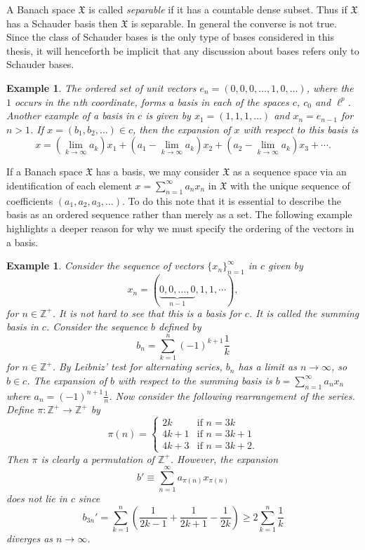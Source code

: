 \documentclass[12pt]{UNSWthesis}
\newcommand{\Z}{\mathbb{Z}}
\newcommand{\X}{\mathfrak{X}}
\def\lp{\ell^p}
\newtheorem{example}[theorem]{Example}
\numberwithin{equation}{section}
\begin{document}
A Banach space $\X$ is called {\em separable} if it has a countable dense 
subset.
Thus if $\X$ has a Schauder basis then $\X$ is separable. In general the 
converse
is not true. Since the class of Schauder bases is the only type of bases
considered in this
thesis, it will henceforth be implicit that any discussion about bases refers
only to Schauder bases.


\begin{example}
The ordered set of unit vectors $e_n=(0,0,0,\ldots,1,0,\ldots)$, where the $1$
occurs in the $n$th coordinate, forms a basis in each of the spaces
$c$, $c_0$ and $\lp$. Another example of a basis in $c$ is given by
$x_1=(1,1,1,\ldots)$
and $x_n=e_{n-1}$ for $n>1$. If $x=(b_1,b_2,\ldots)\in c$, then the expansion of
$x$ with respect to this basis is
\[x=(\lim_{k\rightarrow\infty}a_k)x_1+(a_1-\lim_{k\rightarrow\infty}a_k)x_2+
(a_2-\lim_{k\rightarrow\infty}a_k)x_3+\cdots.\] 
\end{example}


If a Banach space $\X$ has a basis, we may consider $\X$ as a sequence
space via an identification of each element $x=\sum_{n=1}^{\infty}a_nx_n$ in
$\X$ with the unique sequence of coefficients $(a_1,a_2,a_3,\ldots)$. To do this
note that it is essential to describe the basis as an ordered sequence rather
than merely as a set. The following example highlights a deeper reason for
why we must specify the ordering of the vectors in a basis.

\begin{example}\label{summing basis}
Consider the sequence of vectors $\{x_n\}_{n=1}^{\infty}$ in $c$ given by
\[x_n=(\underbrace{0,0,\ldots,0}_{n-1},1,1,\cdots),\]
for $n\in\Z^+$. It is not hard to see that this is a basis for $c$.
It is called the {\em summing basis} in $c$.
Consider the sequence $b$ defined by
\[b_n=\sum_{k=1}^n(-1)^{k+1}\frac{1}{k}\]
for $n\in\Z^+$. By Leibniz' test for alternating series,
$b_n$ has a limit as $n\rightarrow\infty$, so $b\in c$. The expansion of $b$ 
with
respect to the summing basis is $b=\sum_{n=1}^{\infty}a_nx_n$ where
$a_n=(-1)^{n+1}\frac{1}{n}$. Now consider the following rearrangement of the
series. Define $\pi:\Z^+\rightarrow\Z^+$ by
\[\pi(n)=\left\{\begin{array}{ll}
				2k & \mbox{if $n=3k$}\\
				4k+1 & \mbox{if $n=3k+1$}\\
				4k+3 & \mbox{if $n=3k+2$.}
			\end{array}\right.
\]
Then $\pi$ is clearly a permutation of $\Z^+$. However, the expansion
\[b'\equiv\sum_{n=1}^{\infty}a_{\pi(n)}x_{\pi(n)}\]
does not lie in $c$ since
\[b_{3n}'=\sum_{k=1}^n\left(\frac{1}{2k-1}+\frac{1}{2k+1}-\frac{1}{2k}\right)
\geq 2\sum_{k=1}^n\frac{1}{k}\]
diverges as $n\rightarrow\infty$.
\end{example}
\end{document}
